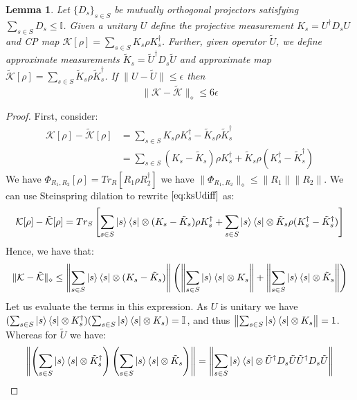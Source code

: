 \documentclass[aps,floatfix,10pt,amssymb,amsfont,amsmath,superscriptaddress,float,nofootinbib,longbibliography,nobalancelastpage,twocolumn]{revtex4-2}
\newtheorem{lemma}{Lemma}
\begin{document}
\begin{widetext}
\begin{lemma}
\label{lemma:3}
Let $\{D_s\}_{s\in S}$ be mutually orthogonal projectors satisfying $\sum_{s\in S} D_s \leq \mathbb{I}$. Given a unitary $U$ define the projective measurement $K_s = U^{\dagger}D_s U$ and CP map $\mathcal{K}[\rho] = \sum_{s \in S} K_s\rho K_s^{\dagger}$. Further, given operator $\tilde U$, we define approximate measurements $\tilde K_s = \tilde U^{\dagger}D_s \tilde U$ and approximate map $\tilde{\mathcal{K}}[\rho] = \sum_{s \in S} \tilde K_s\rho \tilde K_s^{\dagger}$. If $\|U-\tilde U\| \leq \epsilon$ then 
\begin{equation}
    \|\mathcal{K} - \tilde{\mathcal{K}}\|_{\diamond} \leq 6\epsilon
\end{equation}
\end{lemma}
\begin{proof}
First, consider:
\begin{align}
    \mathcal{K}[\rho] - \tilde{\mathcal{K}}[\rho] &= \sum_{s \in S} K_s\rho K_s^{\dagger} - \tilde K_s\rho \tilde K_s^{\dagger} \\
    &= \sum_{s \in S} (K_s-\tilde K_s)\rho K_s^{\dagger} +\tilde K_s\rho (K_s^{\dagger}- \tilde K_s^{\dagger}) \label{eq:ksUdiff}
\end{align}
We have $\Phi_{R_1,R_2}[\rho] = Tr_R[R_{1}\rho R_{2}^{\dagger}]$ we have $\|\Phi_{R_1,R_2}\|_{\diamond} \leq \|R_1\| \|R_2\|$. We can use Steinspring dilation to rewrite $\eqref{eq:ksUdiff}$ as:
\begin{equation}
    \mathcal{K}[\rho] - \tilde{\mathcal{K}}[\rho] = Tr_S\left[\sum_{s\in S}\ket{s}\bra{s}\otimes(K_s-\tilde K_s)\rho K_s^{\dagger} +\sum_{s\in S}\ket{s}\bra{s}\otimes \tilde K_s\rho (K_s^{\dagger}- \tilde K_s^{\dagger})\right]
\end{equation}
Hence, we have that:
\begin{equation}
    \|\mathcal{K} - \tilde{\mathcal{K}}\|_{\diamond} \leq \left\|\sum_{s\in S}\ket{s}\bra{s}\otimes(K_s-\tilde K_s)\right\|\left(\left\|\sum_{s\in S}\ket{s}\bra{s}\otimes K_s \right\|+\left\|\sum_{s\in S}\ket{s}\bra{s}\otimes \tilde K_s \right\|\right)
\end{equation}
Let us evaluate the terms in this expression. As $U$ is unitary we have $(\sum_{s\in S}\ket{s}\bra{s}\otimes K_s^{\dagger}) (\sum_{s\in S}\ket{s}\bra{s}\otimes K_s) = \mathbb{I}$, and thus $\left\|\sum_{s\in S}\ket{s}\bra{s}\otimes K_s \right\| = 1$. Whereas for $\tilde U$ we have:
\begin{align}
    \left\|\left(\sum_{s\in S}\ket{s}\bra{s}\otimes \tilde K_s^{\dagger} \right)\left(\sum_{s\in S}\ket{s}\bra{s}\otimes \tilde K_s \right)\right\| &= \left\|\sum_{s\in S} \ket{s}\bra{s}\otimes\tilde U^{\dagger} D_s \tilde U\tilde U^{\dagger}  D_s \tilde U\right\| \\

\end{align}
\end{proof}
\end{widetext}
\end{document}
